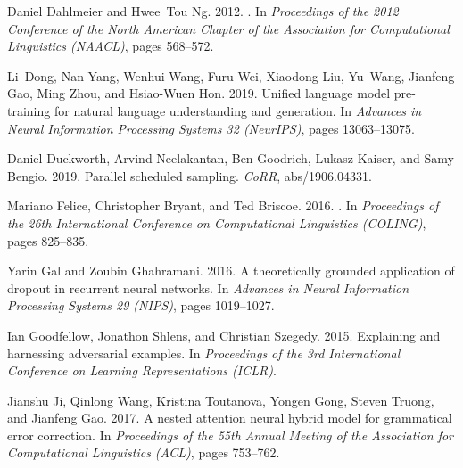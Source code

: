 \documentclass[11pt]{article}
\begin{document}
\begin{thebibliography}{47}
Daniel Dahlmeier and Hwee~Tou Ng. 2012.
.
\newblock In \emph{Proceedings of the 2012 Conference of the North American
  Chapter of the Association for Computational Linguistics (NAACL)}, pages
  568--572.

Li~Dong, Nan Yang, Wenhui Wang, Furu Wei, Xiaodong Liu, Yu~Wang, Jianfeng Gao,
  Ming Zhou, and Hsiao-Wuen Hon. 2019.
\newblock Unified language model pre-training for natural language
  understanding and generation.
\newblock In \emph{Advances in Neural Information Processing Systems 32
  (NeurIPS)}, pages 13063--13075.

Daniel Duckworth, Arvind Neelakantan, Ben Goodrich, Lukasz Kaiser, and Samy
  Bengio. 2019.
\newblock Parallel scheduled sampling.
\newblock \emph{CoRR}, abs/1906.04331.

Mariano Felice, Christopher Bryant, and Ted Briscoe. 2016.
.
\newblock In \emph{{Proceedings of the 26th International Conference on
  Computational Linguistics (COLING)}}, pages 825--835.

Yarin Gal and Zoubin Ghahramani. 2016.
\newblock A theoretically grounded application of dropout in recurrent neural
  networks.
\newblock In \emph{Advances in Neural Information Processing Systems 29
  (NIPS)}, pages 1019--1027.

Ian Goodfellow, Jonathon Shlens, and Christian Szegedy. 2015.
\newblock Explaining and harnessing adversarial examples.
\newblock In \emph{Proceedings of the 3rd International Conference on Learning
  Representations (ICLR)}.

Jianshu Ji, Qinlong Wang, Kristina Toutanova, Yongen Gong, Steven Truong, and
  Jianfeng Gao. 2017.
\newblock A nested attention neural hybrid model for grammatical error
  correction.
\newblock In \emph{Proceedings of the 55th Annual Meeting of the Association
  for Computational Linguistics (ACL)}, pages 753--762.


\end{thebibliography}
\end{document}
